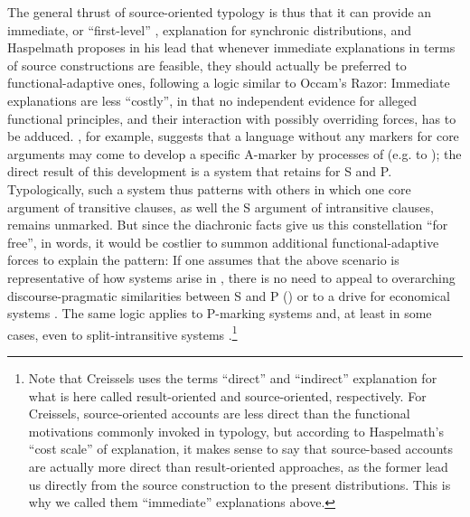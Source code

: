\documentclass[output=paper]{langsci/langscibook}
\begin{document}
The {general} thrust of source-oriented typology is thus that it can provide an immediate, or “first-level” \citep[1]{Creissels2008}, explanation for synchronic distributions, and Haspelmath proposes in his lead  that whenever immediate explanations in terms of source constructions are feasible, they should actually be preferred to functional-adaptive ones, following a logic similar to Occam’s Razor: Immediate explanations are less “costly”, in that no independent evidence for alleged functional principles, and their interaction with possibly overriding forces, has to be adduced. \citet{Cristofaro2014}, for example, suggests that a language without any  markers for core arguments may come to develop a specific A-marker by processes of  (e.g.  to  ); the direct result of this development is a  system that retains  for S and P. Typologically, such a system thus patterns with others in which one core argument of transitive clauses, as well the S argument of intransitive clauses, remains unmarked. But since the diachronic facts give us this constellation “for free”, in  words, it would be costlier to summon additional functional-adaptive forces to explain the pattern: If one assumes that the above scenario is representative of how   systems arise in , there is no need to appeal to overarching discourse-pragmatic similarities between S and P (\citealt{DuBois1987}) or to a  drive for economical  systems \citep{Comrie1989}. The same logic applies to P-marking systems and, at least in some cases, even to split-intransitive systems \citep{Creissels2008}.\footnote{Note that Creissels uses the terms “direct” and “indirect” explanation for what is here called result-oriented and source-oriented, respectively. For Creissels, source-oriented accounts are less direct than the functional motivations commonly invoked in typology, but according to Haspelmath’s “cost scale” of explanation, it makes sense to say that source-based accounts are actually more direct than result-oriented approaches, as the former lead us directly from the source construction to the present distributions. This is why we called them “immediate” explanations above.} 
\end{document}
